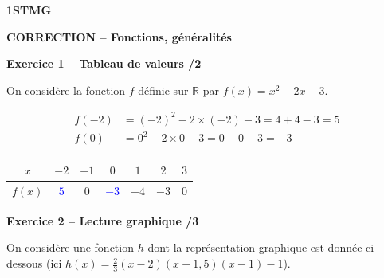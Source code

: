 \documentclass[10pt,a4paper]{article}
\renewcommand{\niveau}{1STMG}
\renewcommand{\chapitre}{Fonctions, généralités}
\renewcommand{\interroversion}[1]{
    \noindent\textbf{\niveau}

    \vspace{-0.5cm}
    \begin{center}
        \textbf{\large CORRECTION -- \chapitre}
    \end{center}

    \vspace{0.1cm}
}
\begin{document}

\interroversion{A}

\textbf{Exercice 1 -- Tableau de valeurs \hfill /2}

On considère la fonction \(f\) définie sur \(\mathbb{R}\) par \(f(x)=x^2-2x-3\).

\[
\begin{aligned}
f(-2) &= (-2)^2-2\times(-2)-3 = 4+4-3 = 5\\
f(0)  &= 0^2-2\times 0-3 = 0-0-3 = -3
\end{aligned}
\]

\begin{center}
    \renewcommand{\arraystretch}{1.5}
    \setlength{\tabcolsep}{0.25cm}
    \begin{tabular}{|*{7}{c|}}
    \hline
    \(x\) & \(-2\) & \(-1\) & \(0\) & \(1\) & \(2\) & \(3\) \\
    \hline
    \(f(x)\) & \textcolor{blue}{\(5\)} & \(0\) & \textcolor{blue}{\(-3\)} & \(-4\) & \(-3\) & \(0\) \\
    \hline
    \end{tabular}
\end{center}

\textbf{Exercice 2 -- Lecture graphique \hfill /3}

On considère une fonction \(h\) dont la représentation graphique est donnée ci-dessous (ici \(h(x)=\frac{2}{3}(x-2)(x+1{,}5)(x-1)-1\)).

\begin{center}
\end{center}
\end{document}
